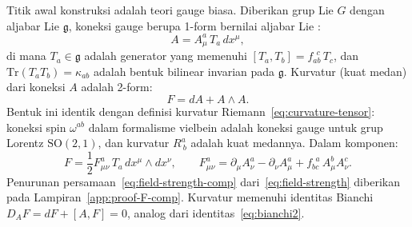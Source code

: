 Titik awal konstruksi adalah teori gauge biasa. Diberikan grup Lie $G$ dengan aljabar Lie $\mathfrak{g}$, koneksi gauge berupa 1-form bernilai aljabar Lie \cite{nakahara2003geometry, eguchi1980}:
\begin{equation}\label{eq:gauge-connection}
    A = A_\mu^a\, T_a\, dx^\mu,
\end{equation}
di mana $T_a \in \mathfrak{g}$ adalah generator yang memenuhi $[T_a, T_b] = f_{ab}^{\ \ c}\, T_c$, dan $\mathrm{Tr}(T_a T_b) = \kappa_{ab}$ adalah bentuk bilinear invarian pada $\mathfrak{g}$. Kurvatur (kuat medan) dari koneksi $A$ adalah 2-form:
\begin{equation}\label{eq:field-strength}
    F = dA + A \wedge A.
\end{equation}
Bentuk ini identik dengan definisi kurvatur Riemann~\eqref{eq:curvature-tensor}: koneksi spin $\omega^{ab}$ dalam formalisme vielbein adalah koneksi gauge untuk grup Lorentz $\mathrm{SO}(2,1)$, dan kurvatur $R^a_{\ b}$ adalah kuat medannya. Dalam komponen:
\begin{equation}\label{eq:field-strength-comp}
    F = \frac{1}{2}F_{\mu\nu}^a\, T_a\, dx^\mu \wedge dx^\nu, \qquad F_{\mu\nu}^a = \partial_\mu A_\nu^a - \partial_\nu A_\mu^a + f_{bc}^{\ \ a}\, A_\mu^b A_\nu^c.
\end{equation}
Penurunan persamaan~\eqref{eq:field-strength-comp} dari~\eqref{eq:field-strength} diberikan pada Lampiran~\ref{app:proof-F-comp}. Kurvatur memenuhi identitas Bianchi $D_AF = dF + [A, F] = 0$, analog dari identitas~\eqref{eq:bianchi2}.

